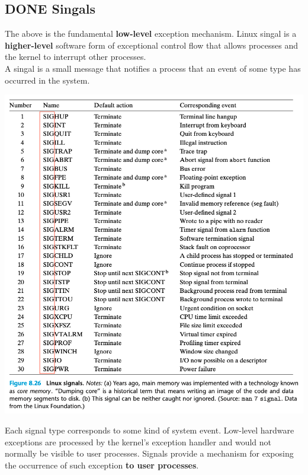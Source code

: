 \documentclass[11pt]{article}
\begin{document}
\subsection{{\bfseries\sffamily DONE} Singals}
\label{sec:org9fd7c61}
The above is the fundamental \textbf{low-level} exception mechanism. Linux singal is a \textbf{higher-level} software form of exceptional control flow that allows processes and the kernel to interrupt other processes.\\

A singal is a small message that notifies a process that an event of some type has occurred in the system.\\

\begin{center}
\includegraphics[width=.9\linewidth]{pics/figure8.26-linux-signals.png}
\end{center}


Each signal type corresponds to some kind of system event. Low-level hardware exceptions are processed by the kernel's exception handler and would not normally be visible to user processes. Signals provide a mechanism for exposing the occurrence of such exception \textbf{to user processes}.\\
\end{document}
